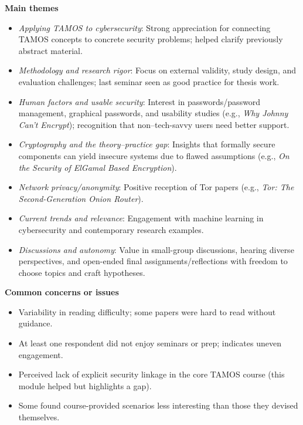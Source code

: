 \documentclass[a4paper]{report}
\begin{document}
\textbf{Main themes}
\begin{itemize}
\item \textit{Applying TAMOS to cybersecurity}: Strong appreciation for connecting TAMOS concepts to concrete security problems; helped clarify previously abstract material.
\item \textit{Methodology and research rigor}: Focus on external validity, study design, and evaluation challenges; last seminar seen as good practice for thesis work.
\item \textit{Human factors and usable security}: Interest in passwords/password management, graphical passwords, and usability studies (e.g., \textit{Why Johnny Can’t Encrypt}); recognition that non–tech-savvy users need better support.
\item \textit{Cryptography and the theory–practice gap}: Insights that formally secure components can yield insecure systems due to flawed assumptions (e.g., \textit{On the Security of ElGamal Based Encryption}).
\item \textit{Network privacy/anonymity}: Positive reception of Tor papers (e.g., \textit{Tor: The Second-Generation Onion Router}).
\item \textit{Current trends and relevance}: Engagement with machine learning in cybersecurity and contemporary research examples.
\item \textit{Discussions and autonomy}: Value in small-group discussions, hearing diverse perspectives, and open-ended final assignments/reflections with freedom to choose topics and craft hypotheses.
\end{itemize}

\textbf{Common concerns or issues}
\begin{itemize}
\item Variability in reading difficulty; some papers were hard to read without guidance.
\item At least one respondent did not enjoy seminars or prep; indicates uneven engagement.
\item Perceived lack of explicit security linkage in the core TAMOS course (this module helped but highlights a gap).
\item Some found course-provided scenarios less interesting than those they devised themselves.
\end{itemize}
\end{document}
